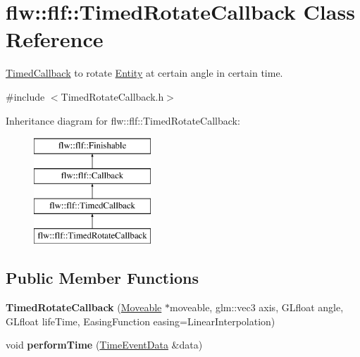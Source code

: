 \hypertarget{classflw_1_1flf_1_1TimedRotateCallback}{}\section{flw\+:\+:flf\+:\+:Timed\+Rotate\+Callback Class Reference}
\label{classflw_1_1flf_1_1TimedRotateCallback}


\hyperlink{classflw_1_1flf_1_1TimedCallback}{Timed\+Callback} to rotate \hyperlink{classflw_1_1flf_1_1Entity}{Entity} at certain angle in certain time.  




{\ttfamily \#include $<$Timed\+Rotate\+Callback.\+h$>$}

Inheritance diagram for flw\+:\+:flf\+:\+:Timed\+Rotate\+Callback\+:\begin{figure}[H]
\begin{center}
\leavevmode
\includegraphics[height=4.000000cm]{classflw_1_1flf_1_1TimedRotateCallback}
\end{center}
\end{figure}
\subsection*{Public Member Functions}
\begin{DoxyCompactItemize}
\item 
{\bfseries Timed\+Rotate\+Callback} (\hyperlink{classflw_1_1flf_1_1Moveable}{Moveable} $\ast$moveable, glm\+::vec3 axis, G\+Lfloat angle, G\+Lfloat life\+Time, Easing\+Function easing=Linear\+Interpolation)\hypertarget{classflw_1_1flf_1_1TimedRotateCallback_acdc28839a8ddd3370a0aa8cb6aa0478d}{}\label{classflw_1_1flf_1_1TimedRotateCallback_acdc28839a8ddd3370a0aa8cb6aa0478d}

\item 
void {\bfseries perform\+Time} (\hyperlink{structflw_1_1flf_1_1TimeEventData}{Time\+Event\+Data} \&data)\hypertarget{classflw_1_1flf_1_1TimedRotateCallback_aeede84042834445cbe597225360b4919}{}\label{classflw_1_1flf_1_1TimedRotateCallback_aeede84042834445cbe597225360b4919}

\end{DoxyCompactItemize}
